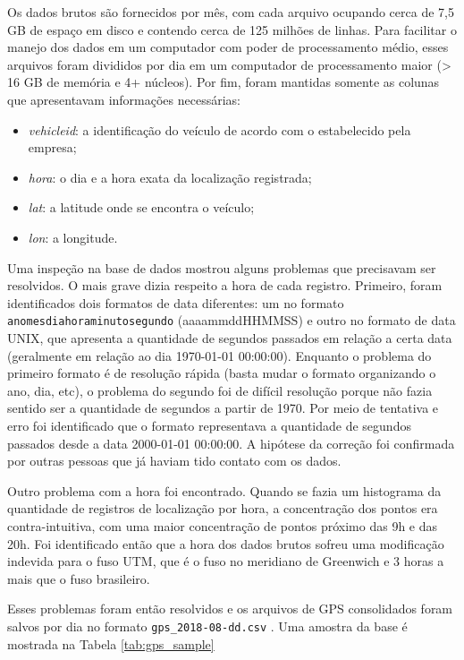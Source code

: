 \documentclass[        
    a4paper,          %
    12pt,             %
    chapter=TITLE,    %
    section=Title,    %
    subsection=Title, %
    oneside,          %
    english,          %
    spanish,          %
    brazil,           %
    fleqn             %
]{abntex2}
\let\oldtexttt\texttt
\renewcommand{\texttt}[1]{
  \colorbox{bgcolor}{\oldtexttt{#1}}
}
\begin{document}
  Os dados brutos são fornecidos por mês, com cada arquivo ocupando cerca de 7,5 GB de espaço em disco e contendo cerca de 125 milhões de linhas. Para facilitar o manejo dos dados em um computador com poder de processamento médio, esses arquivos foram divididos por dia em um computador de processamento maior (\textgreater{} 16 GB de memória e 4+ núcleos). Por fim, foram mantidas somente as colunas que apresentavam informações necessárias:
  
  \begin{itemize}
  \tightlist
  \item
    \emph{vehicleid}: a identificação do veículo de acordo com o estabelecido pela empresa;
  \item
    \emph{hora}: o dia e a hora exata da localização registrada;
  \item
    \emph{lat}: a latitude onde se encontra o veículo;
  \item
    \emph{lon}: a longitude.
  \end{itemize}
  
  Uma inspeção na base de dados mostrou alguns problemas que precisavam ser resolvidos. O mais grave dizia respeito a hora de cada registro. Primeiro, foram identificados dois formatos de data diferentes: um no formato \texttt{anomesdiahoraminutosegundo} (aaaammddHHMMSS) e outro no formato de data UNIX, que apresenta a quantidade de segundos passados em relação a certa data (geralmente em relação ao dia 1970-01-01 00:00:00). Enquanto o problema do primeiro formato é de resolução rápida (basta mudar o formato organizando o ano, dia, etc), o problema do segundo foi de difícil resolução porque não fazia sentido ser a quantidade de segundos a partir de 1970. Por meio de tentativa e erro foi identificado que o formato representava a quantidade de segundos passados desde a data 2000-01-01 00:00:00. A hipótese da correção foi confirmada por outras pessoas que já haviam tido contato com os dados.
  
  Outro problema com a hora foi encontrado. Quando se fazia um histograma da quantidade de registros de localização por hora, a concentração dos pontos era contra-intuitiva, com uma maior concentração de pontos próximo das 9h e das 20h. Foi identificado então que a hora dos dados brutos sofreu uma modificação indevida para o fuso UTM, que é o fuso no meridiano de Greenwich e 3 horas a mais que o fuso brasileiro.
  
  Esses problemas foram então resolvidos e os arquivos de GPS consolidados foram salvos por dia no formato \texttt{gps\_2018-08-dd.csv}. Uma amostra da base é mostrada na Tabela \ref{tab:gps_sample}
  
\end{document}
